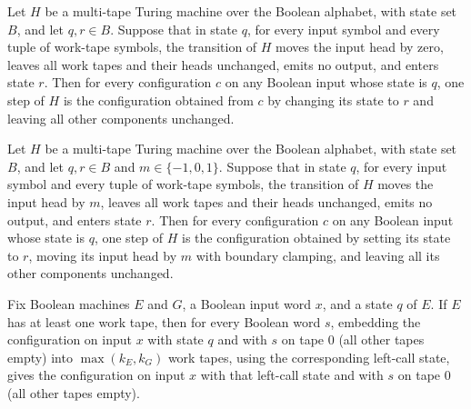 \begin{theorem}
\label{Turing.control_step}
\leanok
{}
Let $H$ be a multi-tape Turing machine over the Boolean alphabet, with state set $B$,
and let $q,r\in B$. Suppose that in state $q$, for every input symbol and every tuple of
work-tape symbols, the transition of $H$ moves the input head by zero, leaves all work
tapes and their heads unchanged, emits no output, and enters state $r$. Then for every
configuration $c$ on any Boolean input whose state is $q$, one step of $H$ is the
configuration obtained from $c$ by changing its state to $r$ and leaving all other
components unchanged.
\end{theorem}

\begin{theorem}
\label{Turing.control_step'}
\leanok
{}
Let $H$ be a multi-tape Turing machine over the Boolean alphabet, with state set $B$,
and let $q,r\in B$ and $m\in\{-1,0,1\}$. Suppose that in state $q$, for every input
symbol and every tuple of work-tape symbols, the transition of $H$ moves the input head
by $m$, leaves all work tapes and their heads unchanged, emits no output, and enters
state $r$. Then for every configuration $c$ on any Boolean input whose state is $q$, one
step of $H$ is the configuration obtained by setting its state to $r$, moving its input
head by $m$ with boundary clamping, and leaving all its other components unchanged.
\end{theorem}

\begin{theorem}
\label{Turing.embed_ofWords_left}
\leanok
{}
Fix Boolean machines $E$ and $G$, a Boolean input word $x$, and a state $q$ of $E$. If
$E$ has at least one work tape, then for every Boolean word $s$, embedding the
configuration on input $x$ with state $q$ and with $s$ on tape $0$ (all other tapes
empty) into $\max(k_E,k_G)$ work tapes, using the corresponding left-call state, gives
the configuration on input $x$ with that left-call state and with $s$ on tape $0$ (all
other tapes empty).
\end{theorem}

